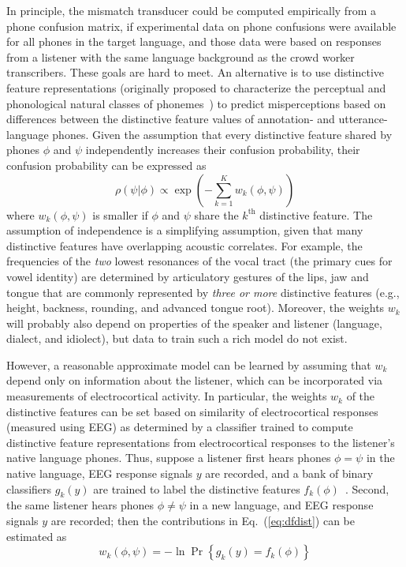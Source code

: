 In principle, the mismatch transducer could be computed empirically from
a phone confusion matrix, if experimental data on phone confusions
were available for all phones in the target language, and those data
were based on responses from a listener with the same language background
as the crowd worker transcribers. These goals are hard to meet. 
An alternative is to use distinctive feature representations
(originally proposed to characterize the perceptual and phonological
natural classes of phonemes~\cite{Jakobson52}) to predict misperceptions
based on differences between the distinctive feature values of 
annotation- and utterance-language phones. Given the assumption that 
every distinctive feature shared by phones $\phi$ and $\psi$ 
independently increases their confusion probability, their confusion 
probability can be expressed as
\begin{equation}
  \rho(\psi|\phi)\propto \exp\left(-\sum_{k=1}^K
  w_k(\phi,\psi)\right)
  \label{eq:dfdist}
\end{equation}
where $w_k(\phi,\psi)$ is
smaller if $\phi$ and $\psi$ share the $k^{\textrm{th}}$ distinctive
feature. The assumption of independence is a simplifying assumption,
given that many distinctive features have overlapping acoustic
correlates. For example, the frequencies of the {\em two} lowest
resonances of the vocal tract (the primary cues for vowel identity) are
determined by articulatory gestures of the lips, jaw and tongue that are
commonly represented by {\em three or more} distinctive features
(e.g., height, backness, rounding, and advanced tongue root). Moreover,
the weights $w_k$ will probably also depend on properties of the speaker
and listener (language, dialect, and idiolect), but data to train such a
rich model do not exist.

However, a reasonable approximate model can be learned by assuming
that $w_k$ depend only on information about the listener, which can be
incorporated via measurements of electrocortical activity. In
particular, the weights $w_k$ of the distinctive features can be set
based on similarity of electrocortical responses (measured using EEG)
as determined by a classifier trained to compute distinctive feature
representations from electrocortical responses to the listener's native
language phones.
Thus, suppose a listener first hears phones $\phi=\psi$ in the native
language, EEG response signals $y$ are recorded, and a bank of
binary classifiers $g_k(y)$ are trained to label the distinctive
features $f_k(\phi)$~\cite{Liberto15}.  Second, the same listener
hears phones $\phi\ne\psi$ in a new language, and EEG response
signals $y$ are recorded;
then the contributions in
Eq.~(\ref{eq:dfdist}) can be estimated as
\begin{equation}
  w_k(\phi,\psi) = -\ln\Pr\left\{g_k(y)= f_k(\phi)\right\}
  \label{eq:eegdist}
\end{equation}
